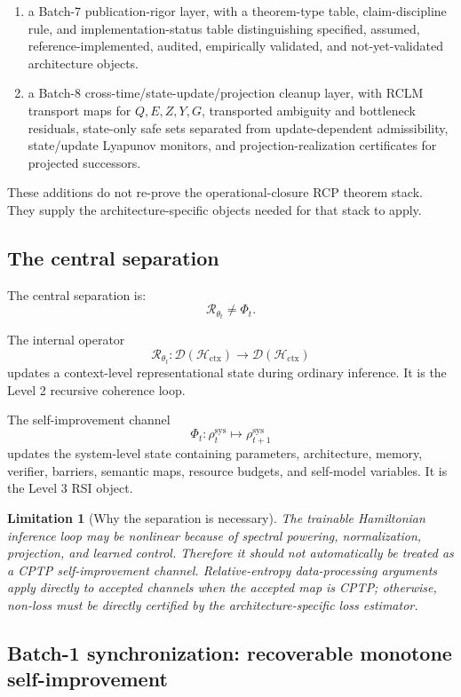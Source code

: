 \documentclass[11pt,a4paper]{article}
\newtheorem{limitation}[theorem]{Limitation}
\newcommand{\D}{\mathcal D}
\newcommand{\Hcal}{\mathcal H}
\newcommand{\Rcal}{\mathcal R}
\newcommand{\sys}{\mathrm{sys}}
\newcommand{\ctx}{\mathrm{ctx}}
\begin{document}
\begin{enumerate}[label=(\arabic*),leftmargin=1.5em]
    \item a Batch-7 publication-rigor layer, with a theorem-type table, claim-discipline rule, and implementation-status table distinguishing specified, assumed, reference-implemented, audited, empirically validated, and not-yet-validated architecture objects.
    \item a Batch-8 cross-time/state-update/projection cleanup layer, with RCLM transport maps for \(Q,E,Z,Y,G\), transported ambiguity and bottleneck residuals, state-only safe sets separated from update-dependent admissibility, state/update Lyapunov monitors, and projection-realization certificates for projected successors.
\end{enumerate}
These additions do not re-prove the operational-closure RCP theorem stack.  They supply the architecture-specific objects needed for that stack to apply.

\subsection{The central separation}

The central separation is:
\[
\boxed{\Rcal_{\theta_t}\neq\Phi_t.}
\]

The internal operator
\[
\Rcal_{\theta_t}:\D(\Hcal_{\ctx})\to\D(\Hcal_{\ctx})
\]
updates a context-level representational state during ordinary inference. It is the Level 2 recursive coherence loop.

The self-improvement channel
\[
\Phi_t:\rho_t^{\sys}\mapsto\rho_{t+1}^{\sys}
\]
updates the system-level state containing parameters, architecture, memory, verifier, barriers, semantic maps, resource budgets, and self-model variables. It is the Level 3 RSI object.

\begin{limitation}[Why the separation is necessary]
The trainable Hamiltonian inference loop may be nonlinear because of spectral powering, normalization, projection, and learned control. Therefore it should not automatically be treated as a CPTP self-improvement channel. Relative-entropy data-processing arguments apply directly to accepted channels when the accepted map is CPTP; otherwise, non-loss must be directly certified by the architecture-specific loss estimator.
\end{limitation}


\subsection{Batch-1 synchronization: recoverable monotone self-improvement}
\label{subsec:batch1-recoverable-monotone-sync}
\end{document}

